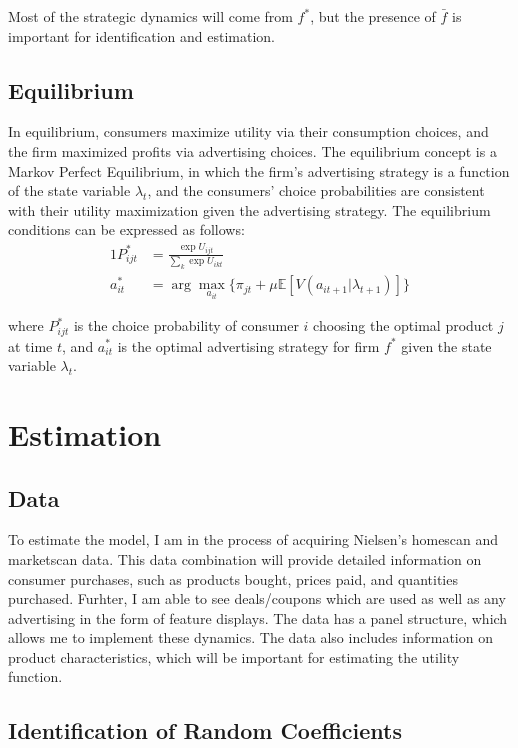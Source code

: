\documentclass[12pt]{article}
\begin{document}
    Most of the strategic dynamics will come from $f^*$, but the presence of $\bar{f}$ is important for identification and estimation.

    \subsection{Equilibrium}
    In equilibrium, consumers maximize utility via their consumption choices, and the firm maximized profits via advertising choices. The equilibrium concept is a Markov Perfect Equilibrium, in which the firm's advertising strategy is a function of the state variable $\lambda_t$, and the consumers' choice probabilities are consistent with their utility maximization given the advertising strategy. The equilibrium conditions can be expressed as follows:
    \begin{alignat*}{1}
      P_{ijt}^* &= \frac{\exp{U_{ijt}}}{\sum_k\exp{U_{ikt}}} \\
      a_{it}^* &= \arg\max_{a_{it}} \{\pi_{jt} + \mu \mathbb{E}[V(a_{it+1} | \lambda_{t+1})]\}
    \end{alignat*}

    where $P_{ijt}^*$ is the choice probability of consumer $i$ choosing the optimal product $j$ at time $t$, and $a_{it}^*$ is the optimal advertising strategy for firm $f^*$ given the state variable $\lambda_t$.

\section{Estimation}

    \subsection{Data}
    To estimate the model, I am in the process of acquiring Nielsen's homescan and marketscan data. This data combination will provide detailed information on consumer purchases, such as products bought, prices paid, and quantities purchased. Furhter, I am able to see deals/coupons which are used as well as any advertising in the form of feature displays. The data has a panel structure, which allows me to implement these dynamics. The data also includes information on product characteristics, which will be important for estimating the utility function. 

    \subsection{Identification of Random Coefficients}
\end{document}
